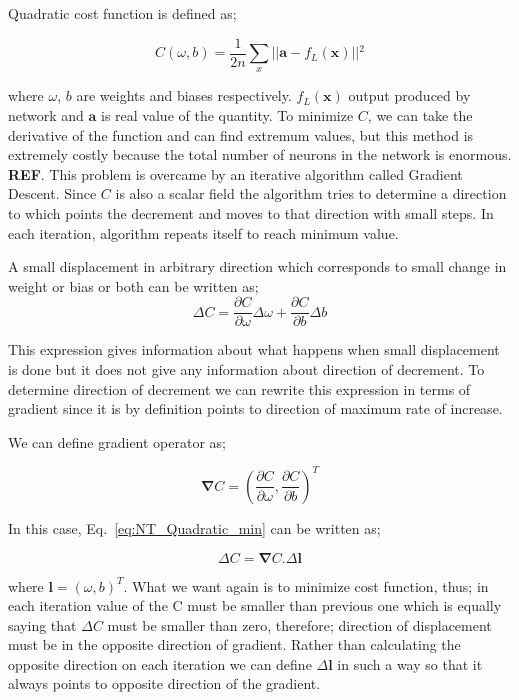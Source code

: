 \documentclass[a4paper,times,12pt]{article}
\begin{document}
Quadratic cost function is defined as;

\begin{equation}
\label{eq:NT_Quadratic}
C(\omega, b) = \frac{1}{2n} \sum\limits_{x} || \boldsymbol{a} - f_L(\boldsymbol{x}) ||{^2} 
\end{equation}

where $\omega$, $b$ are weights and biases respectively. $f_L(\boldsymbol{x})$ output produced by network and $\boldsymbol{a}$ is real value of the quantity. To minimize $C$, we can take the derivative of the function and can find extremum values, but this method is extremely costly because the total number of neurons in the network is enormous. \textbf{REF}. This problem is overcame by an iterative algorithm called Gradient Descent. Since $C$ is also a scalar field the algorithm tries to determine a direction to which points the decrement and moves to that direction with small steps. In each iteration, algorithm repeats itself to reach minimum value. 

A small displacement in arbitrary direction which corresponds to small change in weight or bias or both can be written as;
\begin{equation}
\label{eq:NT_Quadratic_min}
\Delta{C} = \frac{\partial{C}}{\partial{\omega}}\Delta{\omega} + \frac{\partial{C}}{\partial{b}}\Delta{b}
\end{equation}

This expression gives information about what happens when small displacement is done but it does not give any information about direction of decrement. To determine direction of decrement we can rewrite this expression in terms of gradient since it is by definition points to direction of maximum rate of increase. 

We can define gradient operator as;

\begin{equation}
\label{eq:gradient}
\boldsymbol{\nabla}{C} = \left(\frac{\partial{C}}{\partial{\omega}},\frac{\partial{C}}{\partial{b}} \right)^T
\end{equation}

In this case, Eq.~\ref{eq:NT_Quadratic_min} can be written as;

\begin{equation}
\label{eq:NT_Quadratic_min_gradient_form}
\Delta{C} = \boldsymbol{\nabla}{C} \boldsymbol{.} \Delta \boldsymbol{l}
\end{equation}

where $\boldsymbol{l} = (\omega, b)^T$. What we want again is to minimize cost function, thus; in each iteration value of the C must be smaller than previous one which is equally saying that $\Delta{C}$ must be smaller than zero, therefore; direction of displacement must be in the opposite direction of gradient. Rather than calculating the opposite direction on each iteration we can define $\Delta{\boldsymbol{l}}$ in such a way so that it always points to opposite direction of the gradient.
\end{document}
